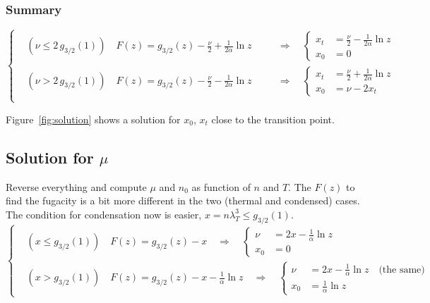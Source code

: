 \documentclass{article}
\begin{document}
\subsubsection*{Summary}
\begin{equation*}
  \left\{
  \begin{aligned}
    &(\nu \leq 2\,g_{3/2}(1)) \quad F(z) = g_{3/2}(z) - \frac{\nu}{2} + \frac{1}{2\alpha}\ln z &&\quad\Rightarrow\quad
      \left\{
      \begin{aligned}
      x_t &= \frac{\nu}{2} - \frac{1}{2\alpha}\ln z \\
      x_0 &= 0
      \end{aligned}\right. \\
    &(\nu > 2\,g_{3/2}(1)) \quad F(z) = g_{3/2}(z) - \frac{\nu}{2} - \frac{1}{2\alpha}\ln z &&\quad\Rightarrow\quad
      \left\{
      \begin{aligned}
        x_t &= \frac{\nu}{2} + \frac{1}{2\alpha}\ln z \\
        x_0 &= \nu - 2 x_t
      \end{aligned}\right. \\
  \end{aligned}
  \right.
\end{equation*}

Figure~\ref{fig:solution} shows a solution for $x_0$, $x_t$ close to the transition point.

\subsection*{Solution for $\mu$}
Reverse everything and compute $\mu$ and $n_0$ as function of $n$ and $T$. The $F(z)$ to find the fugacity is a bit more different in the two (thermal and condensed) cases. The condition for condensation now is easier, $x = n\lambda_T^3 \leq g_{3/2}(1)$.
\begin{equation*}
  \left\{
  \begin{aligned}
    &(x \leq g_{3/2}(1)) \quad F(z) = g_{3/2}(z) - x \quad\Rightarrow\quad
      \left\{
      \begin{aligned}
      \nu &= 2x - \frac{1}{\alpha}\ln z \\
      x_0 &= 0
      \end{aligned}\right. \\
    &(x > g_{3/2}(1)) \quad F(z) = g_{3/2}(z) - x - \frac{1}{\alpha}\ln z \quad\Rightarrow\quad
      \left\{
      \begin{aligned}
        \nu &= 2x - \frac{1}{\alpha}\ln z \quad\text{(the same)} \\
        x_0 &= \frac{1}{\alpha}\ln z
      \end{aligned}\right.
  \end{aligned}
  \right.
\end{equation*}
\end{document}
